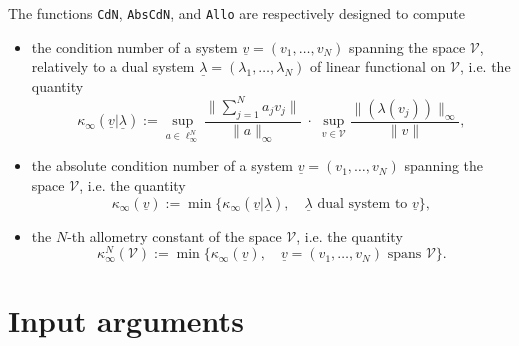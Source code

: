 \documentclass[11pt,leqno]{article}
\theoremstyle{plain}
\theoremstyle{definition}
\theoremstyle{remark}
\newcommand{\VV}{\mathcal{V}}
\newcommand{\ul}{\underline}
\newcommand{\la}{\lambda}
\newcommand{\f}{\frac}
\begin{document}
 The functions {\tt \small CdN}, {\tt \small AbsCdN}, and {\tt \small Allo} are respectively designed to compute 
 \begin{itemize}
 \item the condition number of a system $\ul{v}=(v_1,\ldots,v_N)$ spanning the space $\VV$, relatively to a dual system $\ul{\la}=(\la_1,\ldots,\la_N)$ of linear functional on $\VV$, i.e. the quantity
$$
\kappa_\infty(\ul{v}|\ul{\la}) := 
\sup_{a \in \ell_\infty^N} \f{\big\| \sum\nolimits_{j=1}^N a_j v_j \big\|}{\|a\|_\infty} 
\; \cdot \;
\sup_{v \in \VV} \f{\big\|  (\la(v_j)) \big\|_\infty}{\|v\|},
$$
 \item the absolute condition number of a system $\ul{v}=(v_1,\ldots,v_N)$ spanning the space $\VV$, i.e. the quantity
 $$
 \kappa_\infty(\ul{v}) := \min \big\{
 \kappa_\infty(\ul{v}|\ul{\la}) , \quad
 \mbox{$\ul{\la}$ dual system to $\ul{v}$}
 \big\},
 $$
 \item the $N$-th allometry constant of the space $\VV$, i.e. the quantity
 $$
 \kappa_\infty^N(\VV) := \min \{
 \kappa_\infty(\ul{v}),  \quad
\mbox{$\ul{v}=(v_1,\ldots,v_N)$ spans $\VV$}
 \}.
 $$
 \end{itemize}  
 
 \section{Input arguments}
 
\end{document}
